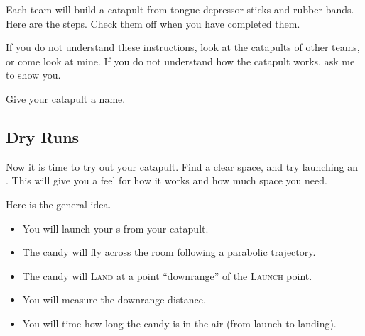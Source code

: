 Each team will build a catapult from tongue depressor sticks and rubber bands.
Here are the steps.
Check them off when you have completed them.

If you do not understand these instructions, look at the catapults of other teams, or come look at mine.
If you do not understand how the catapult works, ask me to show you.

Give your catapult a {name}.

\subsection{Dry Runs}

Now it is time to try out your catapult. 
Find a clear space, and try launching an \mymm. 
This will give you a feel for how it works and how much space you need.

Here is the general idea.
\begin{itemize}[nosep]
    \item You will launch your \mymm{}s from your catapult.
    \item The candy will fly across the room following a parabolic trajectory.
    \item The candy will {\scshape Land} at a point ``downrange'' of the {\scshape Launch} point.
    \item You will measure the downrange distance.
    \item You will time how long the candy is in the air (from launch to landing).
\end{itemize}

